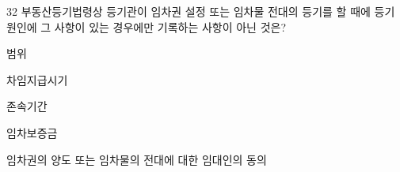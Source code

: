 \begin{question}{32}
부동산등기법령상 등기관이 임차권 설정 또는 임차물 전대의 등기를 할 때에 등기 원인에 그 사항이 있는 경우에만 기록하는 사항이 아닌 것은?
\begin{choices}
  \item 범위
  \item 차임지급시기
  \item 존속기간
  \item 임차보증금
  \item 임차권의 양도 또는 임차물의 전대에 대한 임대인의 동의
\end{choices}
\end{question}
